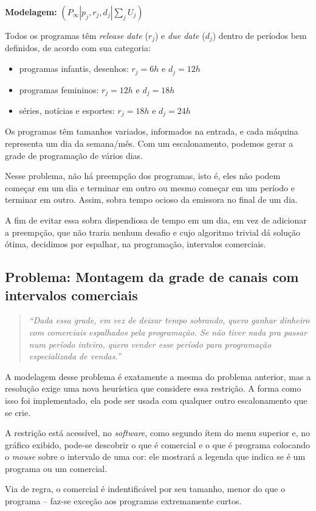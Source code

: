\vspace{1.5em}

\textbf{Modelagem:} {\large $(P_{\infty} | p_j, r_j, d_j | \sum_{j} U_j )$ }

\vspace{1.5em}

Todos os programas têm \textit{release date} ($r_j$) e \textit{due date} ($d_j$) dentro de períodos bem definidos, de acordo com sua categoria: 

\begin{itemize}
	\item{programas infantis, desenhos: $r_j=6h$ e $d_j=12h$}
	\item{programas femininos: $r_j=12h$ e $d_j=18h$}
	\item{séries, notícias e esportes: $r_j=18h$ e $d_j=24h$}
\end{itemize}

Os programas têm tamanhos variados, informados na entrada, e cada máquina representa um dia da semana/mês. Com um escalonamento, podemos gerar a grade de programação de vários dias.

Nesse problema, não há preempção dos programas, isto é, eles não podem começar em um dia e terminar em outro ou mesmo começar em um período e terminar em outro. Assim, sobra tempo ocioso da emissora no final de um dia.

A fim de evitar essa sobra dispendiosa de tempo em um dia, em vez de adicionar a preempção, que não traria nenhum desafio e cujo algoritmo trivial dá solução ótima, decidimos por espalhar, na programação, intervalos comerciais.

\subsection*{Problema: Montagem da grade de canais com intervalos comerciais}

\begin{quote}
	\textit{``Dada essa grade, em vez de deixar tempo sobrando, quero ganhar dinheiro com comerciais espalhados pela programação. Se não tiver nada pra passar num período inteiro, quero vender esse período para programação especializada de vendas.''}
\end{quote}

A modelagem desse problema é exatamente a mesma do problema anterior, mas a resolução exige uma nova heurística que considere essa restrição. A forma como isso foi implementado, ela pode ser usada com qualquer outro escalonamento que se crie. 

A restrição está acessível, no \textit{software}, como segundo ítem do menu superior e, no gráfico exibido, pode-se descobrir o que é comercial e o que é programa colocando o \textit{mouse} sobre o intervalo de uma cor: ele mostrará a legenda que indica se é um programa ou um comercial.

Via de regra, o comercial é indentificável por seu tamanho, menor do que o programa -- faz-se exceção aos programas extremamente curtos.


